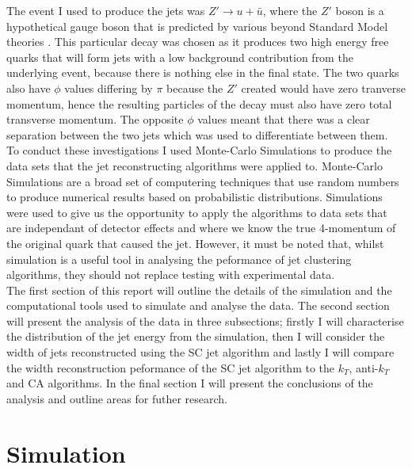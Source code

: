 \documentclass[a4paper,11pt, onecolumn]{article}
\begin{document}
  The event I used to produce the jets was $Z' \to u + \bar{u}$, where the $Z'$ boson is a hypothetical gauge boson 
  that is predicted by various beyond Standard Model theories \cite{Zprime1, Zprime2, Zprime3}.
  This particular decay was chosen as it produces two high energy free quarks that will form jets with a low background contribution from the underlying event,
  because there is nothing else in the final state.
  The two quarks also have $\phi$ values differing by $\pi$ because the $Z'$ created would have zero tranverse momentum, hence the
  resulting particles of the decay must also have zero total transverse momentum. The opposite $\phi$ values meant that there was a clear separation between 
  the two jets which was used to differentiate between them. \\

  To conduct these investigations I used Monte-Carlo Simulations to produce the data sets that the jet reconstructing algorithms were applied to. Monte-Carlo
  Simulations are a broad set of computering techniques that use random numbers to produce numerical results based on probabilistic distributions.
  Simulations were used to give us the opportunity to apply the algorithms to data sets that are independant of detector effects and where we know the true
  4-momentum of the original quark that caused the jet. However, it must be noted that, whilst simulation is a useful tool in analysing the 
  peformance of jet clustering algorithms, they should not replace testing with experimental data. \\

  The first section of this report will outline the details  of the simulation and the computational tools used to simulate and analyse the data. 
  The second section will present the analysis of the data in three subsections; firstly I will characterise the distribution of the jet energy from the simulation, 
  then I will consider the width of jets reconstructed using the SC jet algorithm and lastly I will compare the width reconstruction peformance of the SC jet algorithm
  to the $k_{T}$, anti-$k_T$ and CA algorithms. 
  In the final section I will present the conclusions of the analysis and outline areas for futher research. \\ 
 
\section{Simulation} 
\end{document}
